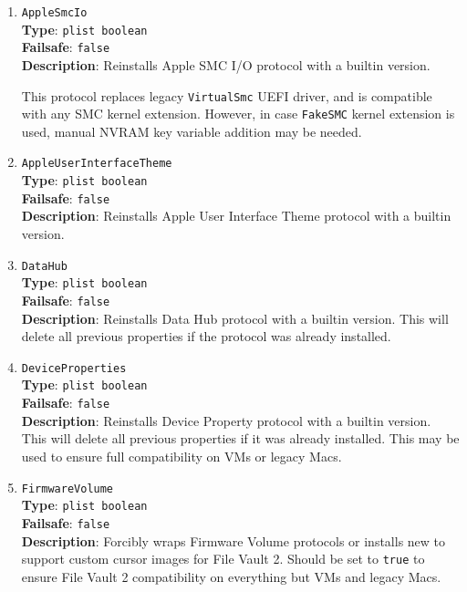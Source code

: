 \documentclass[]{article}
\begin{document}
\begin{enumerate}
\item
  \texttt{AppleSmcIo}\\
  \textbf{Type}: \texttt{plist\ boolean}\\
  \textbf{Failsafe}: \texttt{false}\\
  \textbf{Description}: Reinstalls Apple SMC I/O protocol with a builtin
  version.

  This protocol replaces legacy \texttt{VirtualSmc} UEFI driver, and is compatible
  with any SMC kernel extension. However, in case \texttt{FakeSMC} kernel extension
  is used, manual NVRAM key variable addition may be needed.

\item
  \texttt{AppleUserInterfaceTheme}\\
  \textbf{Type}: \texttt{plist\ boolean}\\
  \textbf{Failsafe}: \texttt{false}\\
  \textbf{Description}: Reinstalls Apple User Interface Theme protocol with a builtin
  version.

\item
  \texttt{DataHub}\\
  \textbf{Type}: \texttt{plist\ boolean}\\
  \textbf{Failsafe}: \texttt{false}\\
  \textbf{Description}: Reinstalls Data Hub protocol with a builtin version.
  This will delete all previous properties if the protocol was already installed.

\item
  \texttt{DeviceProperties}\\
  \textbf{Type}: \texttt{plist\ boolean}\\
  \textbf{Failsafe}: \texttt{false}\\
  \textbf{Description}: Reinstalls Device Property protocol with a builtin
  version. This will delete all previous properties if it was already installed.
  This may be used to ensure full compatibility on VMs or legacy Macs.

\item
  \texttt{FirmwareVolume}\\
  \textbf{Type}: \texttt{plist\ boolean}\\
  \textbf{Failsafe}: \texttt{false}\\
  \textbf{Description}: Forcibly wraps Firmware Volume protocols or installs new
  to support custom cursor images for File Vault 2. Should be set to \texttt{true}
  to ensure File Vault 2 compatibility on everything but VMs and legacy Macs.


\end{enumerate}
\end{document}
